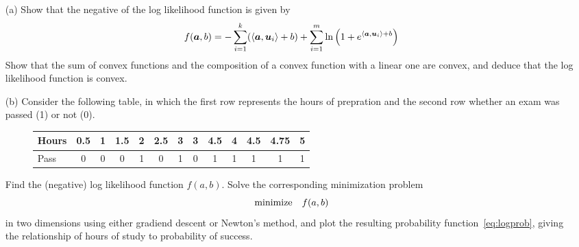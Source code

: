 \documentclass{article}
\begin{document}
\begin{itemize}
 \item[(a)] Show that the negative of the log likelihood function is given by
\begin{equation*}
 f(\bm{a},b) = -\sum_{i=1}^k (\langle {\bm{a}}, {\bm{u}_i} \rangle+b)+\sum_{i=1}^m\ln\left(1+e^{\langle {\bm{a}}, {\bm{u}_i} \rangle+b}\right)
 \end{equation*}
 Show that the sum of convex functions and the composition of a convex function with a linear one are convex, and deduce that the log likelihood function is convex.
 \item[(b)] Consider the following table, in which the first row represents the hours of prepration and the second row whether an exam was passed (1) or not (0).
 \begin{figure}[h!]
 \centering
 \begin{tabular}{l|c|c|c|c|c|c|c|c|c|c|c|c|}
  Hours & 0.5 & 1 & 1.5 & 2 & 2.5 & 3 & 3 & 4.5 & 4 &4.5 & 4.75 & 5 \\
  \hline
  Pass  & 0   & 0 & 0   & 1 & 0   & 1 & 0   & 1 & 1 & 1  & 1    & 1
 \end{tabular}
\end{figure}
Find the (negative) log likelihood function $f(a,b)$. Solve the corresponding minimization problem 
\begin{equation*}
 \text{minimize}\quad f(a,b)
\end{equation*}
in two dimensions using either gradiend descent or Newton's method, and plot the resulting probability function~\eqref{eq:logprob}, giving the relationship of hours of study to probability of success.
\end{itemize}
\end{document}
